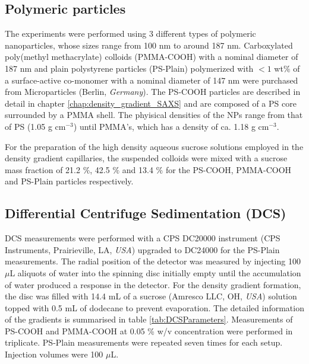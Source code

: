 \subsection{Polymeric particles}

The experiments were performed using 3 different types of polymeric nanoparticles, whose sizes range from 100 nm to around 187 nm. Carboxylated poly(methyl methacrylate) colloids (PMMA-COOH) with a nominal diameter of 187 nm and plain polystyrene particles (PS-Plain) polymerized with $<1$ wt$\%$ of a surface-active co-monomer with a nominal diameter of 147 nm were purchased from Microparticles (Berlin, \emph{Germany}). The PS-COOH particles are described in detail in chapter \ref{chap:density_gradient_SAXS} and are composed of a PS core surrounded by a PMMA shell. The phyisical densities of the NPs range from that of PS (1.05 g cm$^{-3}$) until PMMA's, which has a density of ca. 1.18 g cm$^{-3}$.

For the preparation of the high density aqueous sucrose solutions employed in the density gradient capillaries, the suspended colloids were mixed with a sucrose mass fraction of 21.2 $\%$, 42.5 $\%$ and 13.4 $\%$ for the PS-COOH, PMMA-COOH and PS-Plain particles respectively.


\subsection{Differential Centrifuge Sedimentation (DCS)}
\label{sec:DCS_experimental}
DCS measurements were performed with a CPS DC20000 instrument (CPS Instruments, Prairieville, LA, \emph{USA}) upgraded to DC24000 for the PS-Plain measurements. The radial position of the detector was measured by injecting 100 $\mu$L aliquots of water into the spinning disc initially empty until the accumulation of water produced a response in the detector. For the density gradient formation, the disc was filled with 14.4 mL of a sucrose (Amresco LLC, OH, \emph{USA}) solution topped with 0.5 mL of dodecane to prevent evaporation. The detailed information of the gradients is summarised in table \ref{tab:DCSParameters}. Measurements of PS-COOH and PMMA-COOH at 0.05 \% w/v concentration were performed in triplicate. PS-Plain measurements were repeated seven times for each setup. Injection volumes were 100 $\mu$L. 

